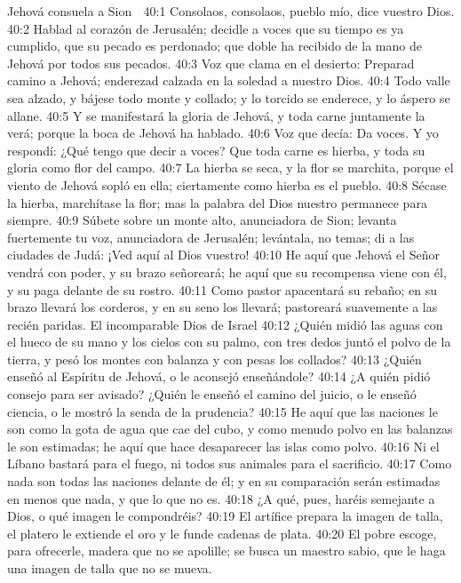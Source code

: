 Jehová consuela a Sion  

40:1 Consolaos, consolaos, pueblo mío, dice vuestro Dios.  
40:2 Hablad al corazón de Jerusalén; decidle a voces que su tiempo es ya cumplido, que su pecado es perdonado; que doble ha recibido de la mano de Jehová por todos sus pecados.  
40:3 Voz que clama en el desierto: Preparad camino a Jehová; enderezad calzada en la soledad a nuestro Dios. 
40:4 Todo valle sea alzado, y bájese todo monte y collado; y lo torcido se enderece, y lo áspero se allane.  
40:5 Y se manifestará la gloria de Jehová, y toda carne juntamente la verá; porque la boca de Jehová ha hablado. 
40:6 Voz que decía: Da voces. Y yo respondí: ¿Qué tengo que decir a voces? Que toda carne es hierba, y toda su gloria como flor del campo.  
40:7 La hierba se seca, y la flor se marchita, porque el viento de Jehová sopló en ella; ciertamente como hierba es el pueblo.  
40:8 Sécase la hierba, marchítase la flor; mas la palabra del Dios nuestro permanece para siempre. 
40:9 Súbete sobre un monte alto, anunciadora de Sion; levanta fuertemente tu voz, anunciadora de Jerusalén; levántala, no temas; di a las ciudades de Judá: ¡Ved aquí al Dios vuestro!  
40:10 He aquí que Jehová el Señor vendrá con poder, y su brazo señoreará; he aquí que su recompensa viene con él, y su paga delante de su rostro. 
40:11 Como pastor apacentará su rebaño; en su brazo llevará los corderos, y en su seno los llevará; pastoreará suavemente a las recién paridas.  
El incomparable Dios de Israel  
40:12 ¿Quién midió las aguas con el hueco de su mano y los cielos con su palmo, con tres dedos juntó el polvo de la tierra, y pesó los montes con balanza y con pesas los collados?  
40:13 ¿Quién enseñó al Espíritu de Jehová, o le aconsejó enseñándole? 
40:14 ¿A quién pidió consejo para ser avisado? ¿Quién le enseñó el camino del juicio, o le enseñó ciencia, o le mostró la senda de la prudencia?  
40:15 He aquí que las naciones le son como la gota de agua que cae del cubo, y como menudo polvo en las balanzas le son estimadas; he aquí que hace desaparecer las islas como polvo.  
40:16 Ni el Líbano bastará para el fuego, ni todos sus animales para el sacrificio.  
40:17 Como nada son todas las naciones delante de él; y en su comparación serán estimadas en menos que nada, y que lo que no es.  
40:18 ¿A qué, pues, haréis semejante a Dios, o qué imagen le compondréis?  
40:19 El artífice prepara la imagen de talla, el platero le extiende el oro y le funde cadenas de plata.  
40:20 El pobre escoge, para ofrecerle, madera que no se apolille; se busca un maestro sabio, que le haga una imagen de talla que no se mueva.  
